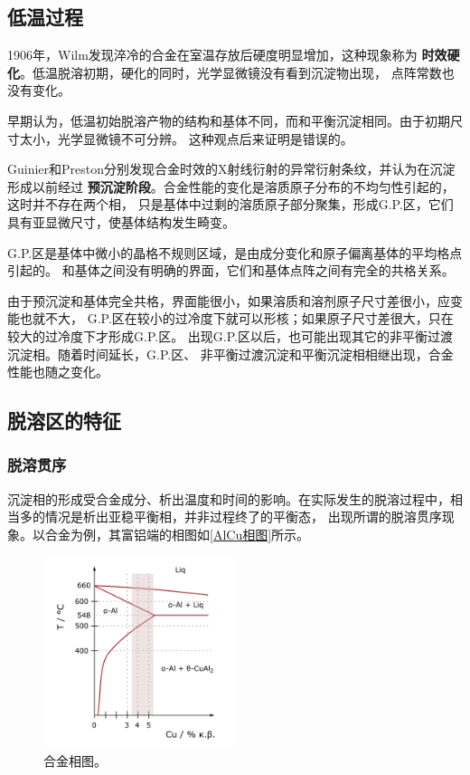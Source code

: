         \subsection{低温过程}
            1906年，Wilm发现淬冷的合金在室温存放后硬度明显增加，这种现象称为
            \textbf{时效硬化}。低温脱溶初期，硬化的同时，光学显微镜没有看到沉淀物出现，
            点阵常数也没有变化。

            早期认为，低温初始脱溶产物的结构和基体不同，而和平衡沉淀相同。由于初期尺寸太小，光学显微镜不可分辨。
            这种观点后来证明是错误的。

            Guinier和Preston分别发现合金时效的X射线衍射的异常衍射条纹，并认为在沉淀形成以前经过
            \textbf{预沉淀阶段}。合金性能的变化是溶质原子分布的不均匀性引起的，这时并不存在两个相，
            只是基体中过剩的溶质原子部分聚集，形成G.P.区，它们具有亚显微尺寸，使基体结构发生畸变。

            G.P.区是基体中微小的晶格不规则区域，是由成分变化和原子偏离基体的平均格点引起的。
            和基体之间没有明确的界面，它们和基体点阵之间有完全的共格关系。

            由于预沉淀和基体完全共格，界面能很小，如果溶质和溶剂原子尺寸差很小，应变能也就不大，
            G.P.区在较小的过冷度下就可以形核；如果原子尺寸差很大，只在较大的过冷度下才形成G.P.区。
            出现G.P.区以后，也可能出现其它的非平衡过渡沉淀相。随着时间延长，G.P.区、
            非平衡过渡沉淀和平衡沉淀相相继出现，合金性能也随之变化。
        \subsection{脱溶区的特征}
            \subsubsection{脱溶贯序}
                沉淀相的形成受合金成分、析出温度和时间的影响。在实际发生的脱溶过程中，相当多的情况是析出亚稳平衡相，并非过程终了的平衡态，
                出现所谓的脱溶贯序现象。以合金为例，其富铝端的相图如\autoref{AlCu相图}所示。
                \begin{figure}[ht]
                    \centering
                    \includegraphics[width=0.5\textwidth]{fig/Al-CU-more-Al.png}
                    \caption{合金相图。}
                    \label{AlCu相图}
                \end{figure}
                
